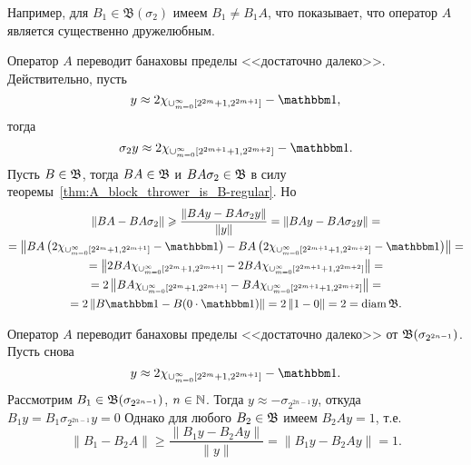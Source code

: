 \begin{remark}
	Например, для $B_1 \in \mathfrak B (\sigma_2)$ имеем $B_1 \ne B_1 A$, что показывает,
	что оператор $A$ является существенно дружелюбным.
\end{remark}

\begin{remark}
	Оператор $A$ переводит банаховы пределы <<достаточно далеко>>. Действительно, пусть
	\begin{equation}
		y \approx 2\chi_{\cup_{m=0}^{\infty}\left[2^{2 m}+1, 2^{2 m+1}\right]} - \mathbbm 1
		,
	\end{equation}
	тогда
	\begin{equation}
		\sigma_2 y \approx 2\chi_{\cup_{m=0}^{\infty}\left[2^{2 m+1}+1, 2^{2 m+2}\right]} - \mathbbm 1
		.
	\end{equation}
	Пусть $B\in\mathfrak{B}$, тогда $BA\in\mathfrak{B}$ и $BA\sigma_2\in\mathfrak{B}$ в силу теоремы~\ref{thm:A_block_thrower_is_B-regular}.
	Но
	\begin{multline}
		\|BA-BA\sigma_2\| \geq \dfrac{\| BAy-BA\sigma_2y \|}{\|y\|} = \| BAy-BA\sigma_2y \| =
		\\=
		\left\| BA\left(2\chi_{\cup_{m=0}^{\infty}\left[2^{2 m}+1, 2^{2 m+1}\right]} - \mathbbm 1\right)-
		BA\left(2\chi_{\cup_{m=0}^{\infty}\left[2^{2 m+1}+1, 2^{2 m+2}\right]} - \mathbbm 1\right) \right\|=
		\\=
		\left\| 2BA\chi_{\cup_{m=0}^{\infty}\left[2^{2 m}+1, 2^{2 m+1}\right]}-
		2BA\chi_{\cup_{m=0}^{\infty}\left[2^{2 m+1}+1, 2^{2 m+2}\right]}  \right\|=
		\\=
		2\left\| BA\chi_{\cup_{m=0}^{\infty}\left[2^{2 m}+1, 2^{2 m+1}\right]}-
		BA\chi_{\cup_{m=0}^{\infty}\left[2^{2 m+1}+1, 2^{2 m+2}\right]}  \right\|=
		\\=
		2\left\| B \mathbbm 1- B (0\cdot \mathbbm 1)  \right\|=
		2\left\| 1- 0  \right\|= 2 = \diam \B
		.
		\end{multline}
\end{remark}

\begin{remark}
	Оператор $A$ переводит банаховы пределы <<достаточно далеко>> от $\mathfrak{B}(\sigma_{2^{2n-1}})$.
	Пусть снова
	\begin{equation}
		y \approx 2\chi_{\cup_{m=0}^{\infty}\left[2^{2 m}+1, 2^{2 m+1}\right]} - \mathbbm 1
		.
	\end{equation}
	Рассмотрим $B_1 \in \mathfrak{B}(\sigma_{2^{2n-1}})$, $n\in\mathbb{N}$.
	Тогда  $y \approx - \sigma_{2^{2n-1}} y$,
	откуда $B_1 y = B_1 \sigma_{2^{2n-1}} y = 0$
	Однако для любого $B_2 \in \mathfrak{B}$ имеем $B_2 A y = 1$,
	т.е.
	\begin{equation}
		\|B_1 - B_2 A\| \geq \dfrac{\|B_1y - B_2 Ay\|}{\|y\|} = \|B_1y - B_2 Ay\| = 1
		.
	\end{equation}
\end{remark}

